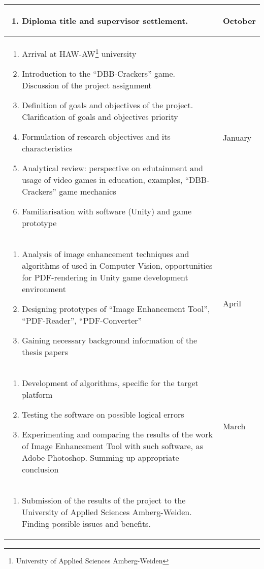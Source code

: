 \begin{titlepage}
\begin{centering}
\begin{longtable}{|p{}|l|}
			\begin{enumerate}
				\item Diploma title and supervisor settlement.
				\end{enumerate} 
				& October \\
				\hline
				\begin{enumerate}
					\item Arrival at HAW-AW\footnote{University of Applied Sciences Amberg-Weiden} university
					\item Introduction to the ``DBB-Crackers'' game. Discussion of the project assignment
					\item Definition of goals and objectives of the project. Clarification of goals and objectives priority
					\item Formulation of research objectives and its characteristics
					\item Analytical review: perspective on edutainment and usage of video games in education, examples, ``DBB-Crackers'' game mechanics
					\item Familiarisation with software (Unity) and game prototype
				\end{enumerate}
				& January \\
				\hline
				\begin{enumerate}
					\item Analysis of image enhancement techniques and algorithms of used in Computer Vision, opportunities for PDF-rendering in Unity game development environment
					\item Designing prototypes of ``Image Enhancement Tool'', ``PDF-Reader'', ``PDF-Converter''
					\item Gaining necessary background information of the thesis papers
				\end{enumerate}
				& April \\
				\hline
				\begin{enumerate}
					\item Development of algorithms, specific for the target platform
					\item Testing the software on possible logical errors
					\item Experimenting and comparing the results of the work of Image Enhancement Tool with such software, as Adobe Photoshop. Summing up appropriate conclusion
				\end{enumerate}
				& March \\
				\hline
				\begin{enumerate}
					\item Submission of the results of the project to the University of Applied Sciences Amberg-Weiden. Finding possible issues and benefits.

\end{enumerate}
\end{longtable}
\end{centering}
\end{titlepage}
